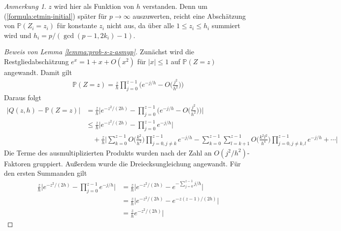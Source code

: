 \documentclass[a4paper, 11pt, ngerman]{article}
\renewcommand{\P}{\mathbb{P}}
\theoremstyle{definition}
\theoremstyle{plain}
\theoremstyle{remark}
\newtheorem*{remark*}{Anmerkung}
\begin{document}
\begin{remark*}
    $z$ wird hier als Funktion von $h$ verstanden. Denn um (\ref{formula:etmin-initial}) später für $p \to \infty$ auszuwerten, reicht eine Abschätzung von $\P(Z_i = z_i)$ für konstante $z_i$ nicht aus, da über alle $1 \le z_i \le h_i$ summiert wird und $h_i = p/(\gcd(p - 1, 2k_i) - 1)$.
\end{remark*}

\begin{proof}[Beweis von Lemma \ref{lemma:prob-s-z-asmyp}]
    Zunächst wird die Restgliedabschätzung $e^x = 1 + x + O(x^2)$ für $|x| \le 1$ auf $\P(Z = z)$ angewandt. Damit gilt
    \begin{align*}
        \P(Z = z) = \frac z h \prod_{j = 0}^{z - 1}
        \Bigg ( e^{-j/h} - O \bigg (\frac {j^2} {h^2} \bigg ) \Bigg )
    \end{align*}
    Daraus folgt
    \begin{align*}
        \vert Q(z, h) - \P(Z = z) \vert
         & = \frac z h \Bigg \vert
        e^{-z^2/(2h)} -
        \prod_{j = 0}^{z - 1}
        \Bigg ( e^{-j/h} - O \bigg (\frac {j^2} {h^2} \bigg ) \Bigg )
        \Bigg \vert                      \\
         & \le \frac z h \Bigg \vert
        e^{-z^2/(2h)} -
        \prod_{j = 0}^{z - 1} e^{-j/h}
        \Bigg \vert                      \\
         & \quad + \frac z h \Bigg \vert
        \sum_{k = 0}^{z - 1} O \bigg ( \frac {k^2} {h^2} \bigg )
        \prod_{j = 0, j \ne k}^{z - 1} e^{-j/h}
        - \sum_{k = 0}^{z - 1}\sum_{l = k+1}^{z - 1}
        O \bigg ( \frac {k^2l^2} {h^4} \bigg )
        \prod_{j = 0, j \ne k,l}^{z - 1} e^{-j/h}
        + \cdots
        \Bigg \vert
    \end{align*}
    Die Terme des ausmultiplizierten Produkts wurden nach der Zahl an $O(j^2/h^2)$-Faktoren gruppiert. Außerdem wurde die Dreiecksungleichung angewandt. Für den ersten Summanden gilt
    \begin{align*}
        \frac z h \Bigg \vert
        e^{-z^2/(2h)} -
        \prod_{j = 0}^{z - 1} e^{-j/h}
        \Bigg \vert
         & = \frac z h \Big \vert
        e^{-z^2/(2h)} -
        e^{-\sum_{j = 0}^{z - 1} j/h}
        \Big \vert                                       \\
         & = \frac z h \Big \vert
        e^{-z^2/(2h)} -  e^{-z(z - 1)/(2h)}
        \Big \vert                                       \\
         & = \frac z h e^{-z^2/(2h)} \Big \vert

\end{align*}
\end{proof}
\end{document}

